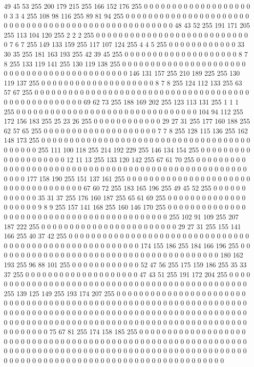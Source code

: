 49 45 53 255 200 179 215 255 166 152 176 255 0 0 0 0 0 0 0 0 0 0 0 0 0 0 0 0 0 0 0 0 3 3 4 255 108 98 116 255 89 81 94 255 0 0 0 0 0 0 0 0 0 0 0 0 0 0 0 0 0 0 0 0
0 0 0 0 0 0 0 0 0 0 0 0 0 0 0 0 0 0 0 0 0 0 0 0 0 0 0 0 0 0 0 0 48 43 52 255 191 171 205 255 113 104 120 255 2 2 2 255 0 0 0 0 0 0 0 0 0 0 0 0 0 0 0 0
0 0 0 0 0 0 0 0 0 0 0 0 7 6 7 255 149 133 159 255 117 107 124 255 4 4 5 255 0 0 0 0 0 0 0 0 0 0 0 0 33 30 35 255 181 163 193 255 42 39 45 255 0 0 0 0 0 0 0 0 0 0 0 0
0 0 0 0 0 0 0 0 8 7 8 255 133 119 141 255 130 119 138 255 0 0 0 0 0 0 0 0 0 0 0 0 0 0 0 0 0 0 0 0 0 0 0 0 0 0 0 0 0 0 0 0 0 0 0 0 0 0 0 0 0 0 0 0
146 131 157 255 210 189 225 255 130 119 137 255 0 0 0 0 0 0 0 0 0 0 0 0 0 0 0 0 0 0 0 0 8 7 8 255 124 112 133 255 63 57 67 255 0 0 0 0 0 0 0 0 0 0 0 0 0 0 0 0 0 0 0 0
0 0 0 0 0 0 0 0 0 0 0 0 0 0 0 0 0 0 0 0 0 0 0 0 0 0 0 0 0 0 0 0 69 62 73 255 188 169 202 255 123 113 131 255 1 1 1 255 0 0 0 0 0 0 0 0 0 0 0 0 0 0 0 0
0 0 0 0 0 0 0 0 0 0 0 0 0 0 0 0 104 94 112 255 172 156 183 255 25 23 26 255 0 0 0 0 0 0 0 0 0 0 0 0 29 27 31 255 177 160 188 255 62 57 65 255 0 0 0 0 0 0 0 0 0 0 0 0
0 0 0 0 0 0 0 0 7 7 8 255 128 115 136 255 162 148 173 255 0 0 0 0 0 0 0 0 0 0 0 0 0 0 0 0 0 0 0 0 0 0 0 0 0 0 0 0 0 0 0 0 0 0 0 0 0 0 0 0 0 0 0 255
111 100 118 255 214 192 229 255 146 134 154 255 0 0 0 0 0 0 0 0 0 0 0 0 0 0 0 0 0 0 0 0 12 11 13 255 133 120 142 255 67 61 70 255 0 0 0 0 0 0 0 0 0 0 0 0 0 0 0 0 0 0 0 0
0 0 0 0 0 0 0 0 0 0 0 0 0 0 0 0 0 0 0 0 0 0 0 0 0 0 0 0 0 0 0 0 0 0 0 0 177 158 190 255 151 137 161 255 0 0 0 0 0 0 0 0 0 0 0 0 0 0 0 0 0 0 0 0
0 0 0 0 0 0 0 0 0 0 0 0 0 0 0 0 67 60 72 255 183 165 196 255 49 45 52 255 0 0 0 0 0 0 0 0 0 0 0 0 35 31 37 255 176 160 187 255 65 61 69 255 0 0 0 0 0 0 0 0 0 0 0 0
0 0 0 0 0 0 0 0 9 8 9 255 157 141 168 255 160 146 170 255 0 0 0 0 0 0 0 0 0 0 0 0 0 0 0 0 0 0 0 0 0 0 0 0 0 0 0 0 0 0 0 0 0 0 0 0 0 0 0 0 0 0 0 255
102 91 109 255 207 187 222 255 0 0 0 0 0 0 0 0 0 0 0 0 0 0 0 0 0 0 0 0 0 0 0 0 29 27 31 255 155 141 166 255 40 37 42 255 0 0 0 0 0 0 0 0 0 0 0 0 0 0 0 0 0 0 0 0
0 0 0 0 0 0 0 0 0 0 0 0 0 0 0 0 0 0 0 0 0 0 0 0 0 0 0 0 0 0 0 0 0 0 0 0 174 155 186 255 184 166 196 255 0 0 0 0 0 0 0 0 0 0 0 0 0 0 0 0 0 0 0 0
0 0 0 0 0 0 0 0 0 0 0 0 0 0 0 0 0 0 0 0 180 162 193 255 96 88 101 255 0 0 0 0 0 0 0 0 0 0 0 0 52 47 56 255 175 159 186 255 35 33 37 255 0 0 0 0 0 0 0 0 0 0 0 0
0 0 0 0 0 0 0 0 47 43 51 255 191 172 204 255 0 0 0 0 0 0 0 0 0 0 0 0 0 0 0 0 0 0 0 0 0 0 0 0 0 0 0 0 0 0 0 0 0 0 0 0 0 0 0 0 0 0 0 0 0 0 0 255
139 125 149 255 193 174 207 255 0 0 0 0 0 0 0 0 0 0 0 0 0 0 0 0 0 0 0 0 0 0 0 0 0 0 0 0 0 0 0 0 0 0 0 0 0 0 0 0 0 0 0 0 0 0 0 0 0 0 0 0 0 0 0 0
0 0 0 0 0 0 0 0 0 0 0 0 0 0 0 0 0 0 0 0 0 0 0 0 0 0 0 0 0 0 0 0 0 0 0 0 0 0 0 0 0 0 0 0 0 0 0 0 0 0 0 0 0 0 0 0 0 0 0 0 0 0 0 0
0 0 0 0 0 0 0 0 0 0 0 0 0 0 0 0 0 0 0 0 0 0 0 0 0 0 0 0 0 0 0 0 0 0 0 0 0 0 0 0 75 67 81 255 174 158 185 255 0 0 0 0 0 0 0 0 0 0 0 0 0 0 0 0
0 0 0 0 0 0 0 0 0 0 0 0 0 0 0 0 0 0 0 0 0 0 0 0 0 0 0 0 0 0 0 0 0 0 0 0 0 0 0 0 0 0 0 0 0 0 0 0 0 0 0 0 0 0 0 0 0 0 0 0 0 0 0 0
0 0 0 0 0 0 0 0 0 0 0 0 0 0 0 0 0 0 0 0 0 0 0 0 0 0 0 0 0 0 0 0 0 0 0 0 0 0 0 0 0 0 0 0 0 0 0 0 0 0 0 0 0 0 0 0 0 0 0 0 0 0 0 0